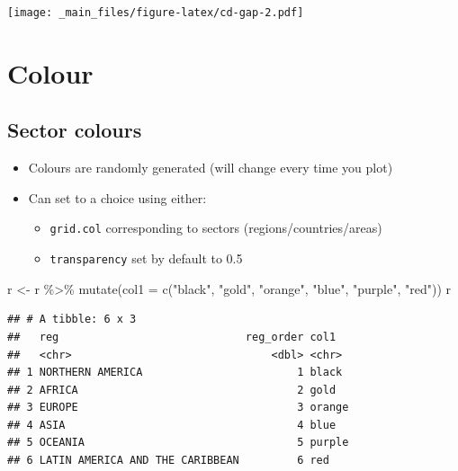 \documentclass[
]{book}
\newenvironment{Shaded}{\begin{snugshade}}{\end{snugshade}}
\newcommand{\AttributeTok}[1]{\textcolor[rgb]{0.77,0.63,0.00}{#1}}
\newcommand{\FunctionTok}[1]{\textcolor[rgb]{0.00,0.00,0.00}{#1}}
\newcommand{\NormalTok}[1]{#1}
\newcommand{\OtherTok}[1]{\textcolor[rgb]{0.56,0.35,0.01}{#1}}
\newcommand{\SpecialCharTok}[1]{\textcolor[rgb]{0.00,0.00,0.00}{#1}}
\newcommand{\StringTok}[1]{\textcolor[rgb]{0.31,0.60,0.02}{#1}}
\providecommand{\tightlist}{%
  \setlength{\itemsep}{0pt}\setlength{\parskip}{0pt}}
\begin{document}
\texttt{[image: \_main\_files/figure-latex/cd-gap-2.pdf]}

\hypertarget{colour}{%
\section{Colour}\label{colour}}

\hypertarget{sector-colours}{%
\subsection{Sector colours}\label{sector-colours}}

\begin{itemize}
\tightlist
\item
  Colours are randomly generated (will change every time you plot)
\item
  Can set to a choice using either:

  \begin{itemize}
  \tightlist
  \item
    \texttt{grid.col} corresponding to sectors (regions/countries/areas)
  \item
    \texttt{transparency} set by default to 0.5
  \end{itemize}
\end{itemize}

\begin{Shaded}
\begin{Highlighting}[]
\NormalTok{r }\OtherTok{\textless{}{-}}\NormalTok{ r }\SpecialCharTok{\%\textgreater{}\%}
  \FunctionTok{mutate}\NormalTok{(}\AttributeTok{col1 =} \FunctionTok{c}\NormalTok{(}\StringTok{"black"}\NormalTok{, }\StringTok{"gold"}\NormalTok{, }\StringTok{"orange"}\NormalTok{, }\StringTok{"blue"}\NormalTok{, }\StringTok{"purple"}\NormalTok{, }\StringTok{"red"}\NormalTok{))}
\NormalTok{r}
\end{Highlighting}
\end{Shaded}

\begin{verbatim}
## # A tibble: 6 x 3
##   reg                             reg_order col1  
##   <chr>                               <dbl> <chr> 
## 1 NORTHERN AMERICA                        1 black 
## 2 AFRICA                                  2 gold  
## 3 EUROPE                                  3 orange
## 4 ASIA                                    4 blue  
## 5 OCEANIA                                 5 purple
## 6 LATIN AMERICA AND THE CARIBBEAN         6 red
\end{verbatim}
\end{document}
